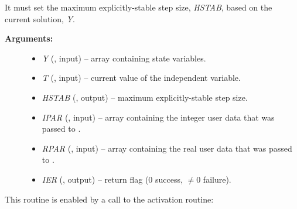 \documentclass[letterpaper,10pt,english]{sphinxmanual}
\begin{document}
\begin{fulllineitems}
\label{f_interface/Usage:f/_/FARKEXPSTAB}
It must set the maximum explicitly-stable step size, \emph{HSTAB}, based
on the current solution, \emph{Y}.
\begin{description}
\item[{\textbf{Arguments:}}] \leavevmode\begin{itemize}
\item {} 
\emph{Y} (, input) -- array containing state variables.

\item {} 
\emph{T} (, input) -- current value of the independent variable.

\item {} 
\emph{HSTAB} (, output) -- maximum explicitly-stable step size.

\item {} 
\emph{IPAR} (, input) -- array containing the integer user data that was passed
to {\hyperref[f_interface/Usage:f/_/FARKMALLOC]{}}.

\item {} 
\emph{RPAR} (, input) -- array containing the real user data that was passed to
{\hyperref[f_interface/Usage:f/_/FARKMALLOC]{}}.

\item {} 
\emph{IER} (, output) -- return flag (0 success, $\ne 0$ failure).

\end{itemize}

\end{description}

\end{fulllineitems}


This routine is enabled by a call to the activation routine:
\end{document}
